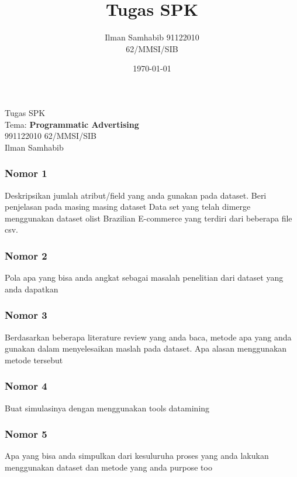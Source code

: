 \documentclass{article}
\title{Tugas SPK}
\author{Ilman Samhabib 91122010\\62/MMSI/SIB}
\date{\today}
\begin{document}
\begin{center}
    Tugas SPK
    \\ Tema: \textbf{Programmatic Advertising} 
    \\ 991122010 62/MMSI/SIB
    \\ Ilman Samhabib
\end{center}

\subsubsection*{Nomor 1}
Deskripsikan jumlah atribut/field yang anda gunakan pada dataset. Beri penjelasan pada masing masing dataset
\bigbreak
Data set yang telah dimerge menggunakan dataset olist Brazilian E-commerce \cite{olist_2018}  yang terdiri dari beberapa file csv.
\subsubsection*{Nomor 2}
Pola apa yang bisa anda angkat sebagai masalah penelitian dari dataset yang anda dapatkan
\subsubsection*{Nomor 3}
Berdasarkan beberapa literature review yang anda baca, metode apa yang anda gunakan dalam menyelesaikan maslah pada dataset. Apa alasan menggunakan metode tersebut
\subsubsection*{Nomor 4}
Buat simulasinya dengan menggunakan tools datamining 
\subsubsection*{Nomor 5}
Apa yang bisa anda simpulkan dari kesuluruha proses yang anda lakukan menggunakan dataset dan metode yang anda purpose
too\cite{ECommerceWebsWijaya2021}





\end{document}
